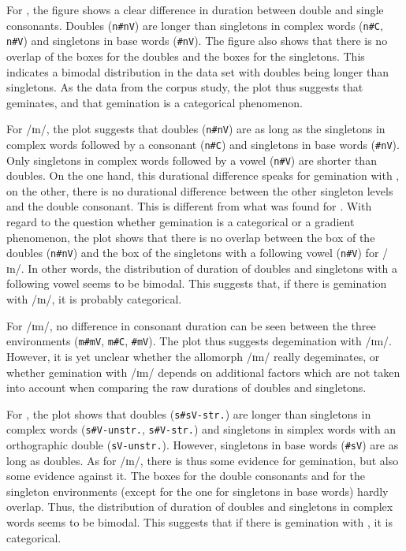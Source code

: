For ,  the figure shows a clear difference in duration between double and single consonants. Doubles (\texttt{n\#nV}) are longer than singletons in complex words (\texttt{n\#C}, \texttt{n\#V}) and singletons in base words (\texttt{\#nV}). 
  The figure also shows that there is no overlap of the boxes for the doubles and the boxes for the singletons. This indicates a bimodal distribution in the data set with doubles being longer than singletons. 
As the data from the corpus study, the  plot thus suggests that  geminates, and that gemination is a categorical phenomenon. 



For /ɪn/, the plot suggests that doubles (\texttt{n\#nV}) are as long as the singletons in complex words followed by a consonant (\texttt{n\#C}) and singletons in base words (\texttt{\#nV}). Only singletons in complex words followed by a vowel (\texttt{n\#V}) are shorter than doubles. 
On the one hand, this durational difference speaks for gemination with , on the other, there is no durational difference between the other singleton levels and the double consonant. This is different from what was found for .
With regard to the question whether gemination is a categorical or a gradient phenomenon, the plot shows that there is no overlap between the box of the doubles (\texttt{n\#nV}) and the box of the singletons with a following vowel (\texttt{n\#V}) for /ɪn/. In other words, the distribution of duration of doubles and singletons with a following vowel seems to be bimodal. This suggests that, if there is gemination with /ɪn/, it is probably categorical.

For /ɪm/, no difference in consonant duration can be seen between the three environments (\texttt{m\#mV}, \texttt{m\#C}, \texttt{\#mV}). The plot thus suggests degemination with /ɪm/. However, 
it is yet unclear whether the allomorph /ɪm/ really degeminates, or whether gemination with /ɪm/ depends on additional factors which are not taken into account when comparing the raw durations of doubles and singletons. 


For , the plot shows that doubles (\texttt{s\#sV-str.})  are longer than singletons in complex words (\texttt{s\#V-unstr.}, \texttt{s\#V-str.}) and singletons in simplex words with an orthographic double (\texttt{sV-unstr.}). However, singletons in base words (\texttt{\#sV}) are as long as doubles. 
As for /ɪn/, there is thus some evidence for gemination, but also some evidence against it.  
The boxes for the double consonants and  for the singleton environments (except for the one for singletons in base words)  hardly overlap. Thus, the distribution of duration of doubles and singletons in complex words seems to be bimodal. This suggests that if there is gemination with , it is categorical.



